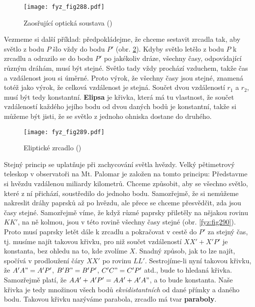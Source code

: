 {    \begin{figure}[ht!] %
      \centering
      \texttt{[image: fyz\_fig288.pdf]}
      \caption{Zaosřující optická soustava
               (\cite[s.~351]{Feynman01})}
      \label{fyz:fig288}
    \end{figure}

    Vezmeme si další příklad: předpokládejme, že chceme sestavit zrcadla tak, aby světlo z bodu 
    \(P\) šlo vždy do bodu \(P'\) (obr. \ref{fyz:fig289}). Kdyby světlo letělo z bodu \(P\) k 
    zrcadlu a odrazilo se do bodu \(P'\) po jakékoliv dráze, všechny časy, odpovídající různým 
    dráhám, musí být stejné. Světlo tady vždy prochází vzduchem, takže čas a vzdálenost jsou si 
    úměrné. Proto výrok, že všechny časy jsou stejné, znamená totéž jako výrok, že celková 
    vzdálenost je stejná. Součet dvou vzdáleností \(r_1\) a \(r_2\), musí být tedy konstantní. 
    \textbf{Elipsa} je křivka, která má tu vlastnost, že součet vzdáleností každého jejího bodu od 
    dvou daných bodů je konstantní, takže si můžeme být jisti, že se světlo z jednoho ohniska 
    dostane do druhého.
    
    \begin{figure}[ht!] %
      \centering
      \texttt{[image: fyz\_fig289.pdf]}
      \caption{Eliptické zrcadlo
               (\cite[s.~351]{Feynman01})}
      \label{fyz:fig289}
    \end{figure}

    Stejný princip se uplatňuje při zachycování světla hvězdy. Velký pětimetrový teleskop v 
    observatoři na Mt. Palomar je založen na tomto principu: Představme si hvězdu vzdálenou 
    miliardy kilometrů. Chceme způsobit, aby se všechno světlo, které z ní přichází, soustředilo do 
    jednoho bodu. Samozřejmě, že si nemůžeme nakreslit dráhy paprsků až po hvězdu, ale přece se 
    chceme přesvědčit, zda jsou časy stejné. Samozřejmě víme, že když různé paprsky přiletěly na 
    nějakou rovinu \(KK'\), na ně kolmou, jsou v této rovině všechny časy stejné (obr. 
    \ref{fyz:fig290}). Proto musí paprsky letět dále k zrcadlu a pokračovat v cestě do \(P'\) za 
    stejný čas, tj. musíme najít takovou křivku, pro niž součet vzdáleností \(XX' + X'P'\) je 
    konstanta, bez ohledu na to, kde zvolíme \(X\). Snadný způsob, jak to lze najít, spočívá v 
    prodloužení čáry \(XX'\) po rovinu \(LL'\). Sestrojíme-li nyní takovou křivku, že \(A'A" = 
    A'P'\), \(B'B" = B'P'\), \(C'C" = C'P'\) atd., bude to hledaná křivka. Samozřejmě platí, že 
    \(AA' + A'P' = AA' + A'A"\), a to bude konstanta. Naše křivka je tedy množinou všech bodů 
    \emph{ekvidistantních} od dané přímky a daného bodu. Takovou křivku nazýváme parabola, zrcadlo 
    má tvar \textbf{paraboly}.

}
